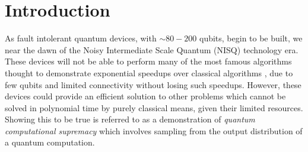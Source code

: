 \section*{Introduction} \label{sec:intro}

As fault intolerant quantum devices, with $\sim 80-200$ qubits, begin to be built, we near the dawn of the Noisy Intermediate Scale Quantum (NISQ) \cite{preskill_quantum_2018} technology era. These devices will not be able to perform many of the most famous algorithms thought to demonstrate exponential speedups over classical algorithms \cite{shor_polynomial-time_1997, harrow_quantum_2009}, due to few qubits and limited connectivity without losing such speedups. However, these devices could provide an efficient solution to other problems which cannot be solved in polynomial time by purely classical means, given their limited resources. Showing this to be true is referred to as a demonstration of \textit{quantum computational supremacy}\cite{bremner_classical_2011, gao_quantum_2017, bremner_average-case_2016,  aaronson_computational_2013, farhi_quantum_2016, boixo_characterizing_2018} which involves sampling from the output distribution of a quantum computation.
